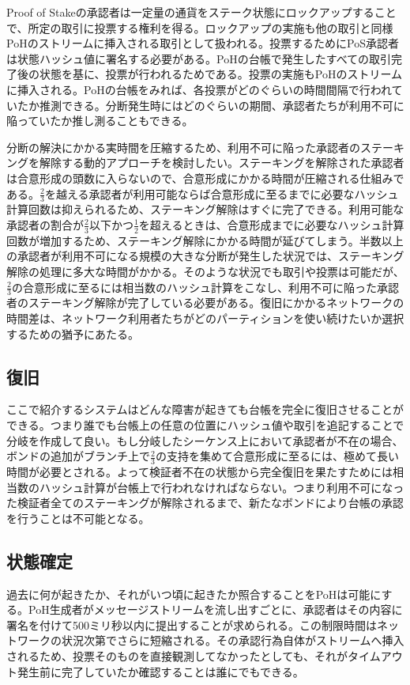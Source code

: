\documentclass[12pt]{ltjsarticle}
\begin{document}
Proof of Stakeの承認者は一定量の通貨をステーク状態にロックアップすることで、所定の取引に投票する権利を得る。ロックアップの実施も他の取引と同様PoHのストリームに挿入される取引として扱われる。投票するためにPoS承認者は状態ハッシュ値に署名する必要がある。PoHの台帳で発生したすべての取引完了後の状態を基に、投票が行われるためである。投票の実施もPoHのストリームに挿入される。PoHの台帳をみれば、各投票がどのぐらいの時間間隔で行われていたか推測できる。分断発生時にはどのぐらいの期間、承認者たちが利用不可に陥っていたか推し測ることもできる。

分断の解決にかかる実時間を圧縮するため、利用不可に陥った承認者のステーキングを解除する動的アプローチを検討したい。ステーキングを解除された承認者は合意形成の頭数に入らないので、合意形成にかかる時間が圧縮される仕組みである。\(\frac{2}{3}\)を越える承認者が利用可能ならば合意形成に至るまでに必要なハッシュ計算回数は抑えられるため、ステーキング解除はすぐに完了できる。利用可能な承認者の割合が\(\frac{2}{3}\)以下かつ\(\frac{1}{2}\)を超えるときは、合意形成までに必要なハッシュ計算回数が増加するため、ステーキング解除にかかる時間が延びてしまう。半数以上の承認者が利用不可になる規模の大きな分断が発生した状況では、ステーキング解除の処理に多大な時間がかかる。そのような状況でも取引や投票は可能だが、\(\frac{2}{3}\)の合意形成に至るには相当数のハッシュ計算をこなし、利用不可に陥った承認者のステーキング解除が完了している必要がある。復旧にかかるネットワークの時間差は、ネットワーク利用者たちがどのパーティションを使い続けたいか選択するための猶予にあたる。

\subsection{復旧}\label{availability}
ここで紹介するシステムはどんな障害が起きても台帳を完全に復旧させることができる。つまり誰でも台帳上の任意の位置にハッシュ値や取引を追記することで分岐を作成して良い。もし分岐したシーケンス上において承認者が不在の場合、ボンドの追加がブランチ上で\(\frac{2}{3}\)の支持を集めて合意形成に至るには、極めて長い時間が必要とされる。よって検証者不在の状態から完全復旧を果たすためには相当数のハッシュ計算が台帳上で行われなければならない。つまり利用不可になった検証者全てのステーキングが解除されるまで、新たなボンドにより台帳の承認を行うことは不可能となる。

\subsection{状態確定}\label{availability}
過去に何が起きたか、それがいつ頃に起きたか照合することをPoHは可能にする。PoH生成者がメッセージストリームを流し出すごとに、承認者はその内容に署名を付けて500ミリ秒以内に提出することが求められる。この制限時間はネットワークの状況次第でさらに短縮される。その承認行為自体がストリームへ挿入されるため、投票そのものを直接観測してなかったとしても、それがタイムアウト発生前に完了していたか確認することは誰にでもできる。
\end{document}
